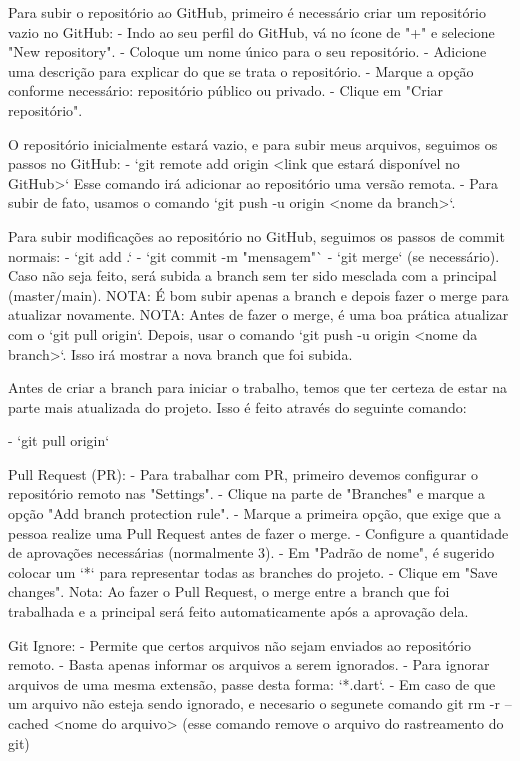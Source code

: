 Para subir o repositório ao GitHub, primeiro é necessário criar um repositório vazio no GitHub:
 - Indo ao seu perfil do GitHub, vá no ícone de "+" e selecione "New repository".
 - Coloque um nome único para o seu repositório.
 - Adicione uma descrição para explicar do que se trata o repositório.
 - Marque a opção conforme necessário: repositório público ou privado.
 - Clique em "Criar repositório".

O repositório inicialmente estará vazio, e para subir meus arquivos, seguimos os passos no GitHub:
 - `git remote add origin <link que estará disponível no GitHub>`
   Esse comando irá adicionar ao repositório uma versão remota.
 - Para subir de fato, usamos o comando `git push -u origin <nome da branch>`.

Para subir modificações ao repositório no GitHub, seguimos os passos de commit normais:
    - `git add .`
    - `git commit -m "mensagem"`
    - `git merge` (se necessário). Caso não seja feito, será subida a branch sem ter sido mesclada com a principal (master/main).
    NOTA: É bom subir apenas a branch e depois fazer o merge para atualizar novamente.
    NOTA: Antes de fazer o merge, é uma boa prática atualizar com o `git pull origin`.
    Depois, usar o comando `git push -u origin <nome da branch>`.
    Isso irá mostrar a nova branch que foi subida.

Antes de criar a branch para iniciar o trabalho, temos que ter certeza de estar na parte
mais atualizada do projeto. Isso é feito através do seguinte comando:

   - `git pull origin`

Pull Request (PR):
   - Para trabalhar com PR, primeiro devemos configurar o repositório remoto nas "Settings".
   - Clique na parte de "Branches" e marque a opção "Add branch protection rule".
   - Marque a primeira opção, que exige que a pessoa realize uma Pull Request antes de fazer o merge.
   - Configure a quantidade de aprovações necessárias (normalmente 3).
   - Em "Padrão de nome", é sugerido colocar um `*` para representar todas as branches do projeto.
   - Clique em "Save changes".
   Nota: Ao fazer o Pull Request, o merge entre a branch que foi trabalhada e a principal será feito automaticamente
   após a aprovação dela.

Git Ignore:
   - Permite que certos arquivos não sejam enviados ao repositório remoto.
   - Basta apenas informar os arquivos a serem ignorados.
   - Para ignorar arquivos de uma mesma extensão, passe desta forma: `*.dart`.
   - Em caso de que um arquivo não esteja sendo ignorado, e necesario o segunete comando
      git rm -r --cached <nome do arquivo> (esse comando remove o arquivo do rastreamento do git)